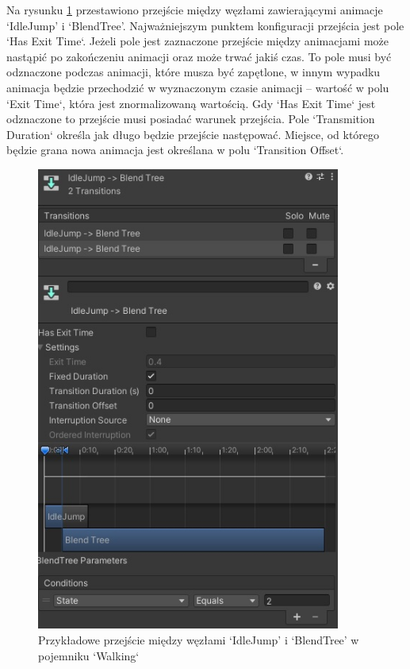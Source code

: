 \documentclass[12pt,twoside]{article}
\begin{document}
Na rysunku \ref{Hero:Aniamtor:Transition} przestawiono przejście między węzłami
zawierającymi animacje `IdleJump' i `BlendTree'. Najważniejszym punktem
konfiguracji przejścia jest pole `Has Exit Time`. Jeżeli pole jest zaznaczone
przejście między animacjami może nastąpić po zakończeniu animacji oraz może
trwać jakiś czas. To pole musi być odznaczone podczas animacji, które musza być
zapętlone, w innym wypadku animacja będzie przechodzić w wyznaczonym czasie
animacji -- wartość w polu `Exit Time`, która jest znormalizowaną wartością. Gdy
`Has Exit Time` jest odznaczone to przejście musi posiadać warunek przejścia.
Pole `Transmition Duration` określa jak długo będzie przejście następować.
Miejsce, od którego będzie grana nowa animacja jest określana w polu `Transition
Offset`.


\begin{figure}[ht]
    \centering
	\includegraphics[width=10cm]{RealizacjaProjektu/UnityPictires/Animator/Player1_Animator_Transition.jpg}
	\caption{Przykładowe przejście między węzłami `IdleJump' i `BlendTree' w pojemniku `Walking`}
    \label{Hero:Aniamtor:Transition}
\end{figure}
\end{document}
